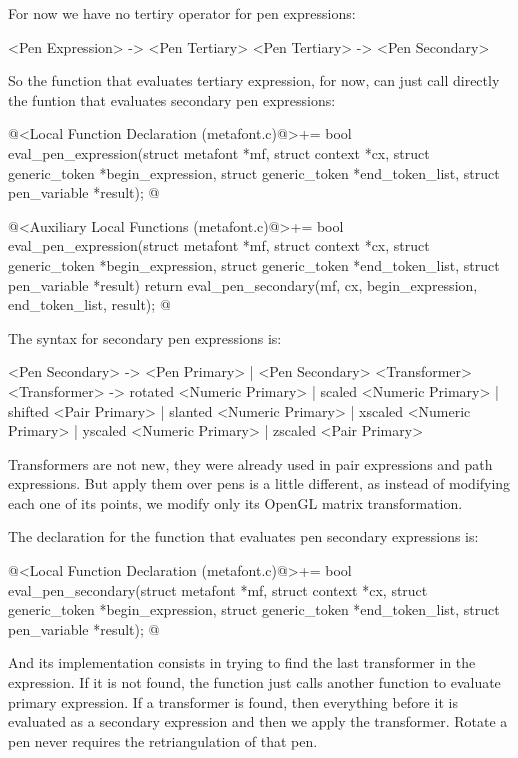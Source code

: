 For now we have no tertiry operator for pen expressions:

\alinhaverbatim
<Pen Expression> -> <Pen Tertiary>
<Pen Tertiary> -> <Pen Secondary>
\alinhanormal

So the function that evaluates tertiary expression, for now, can just
call directly the funtion that evaluates secondary pen expressions:

\iniciocodigo
@<Local Function Declaration (metafont.c)@>+=
bool eval_pen_expression(struct metafont *mf, struct context *cx,
                        struct generic_token *begin_expression,
                        struct generic_token *end_token_list,
                        struct pen_variable *result);
@
\fimcodigo

\iniciocodigo
@<Auxiliary Local Functions (metafont.c)@>+=
bool eval_pen_expression(struct metafont *mf, struct context *cx,
                        struct generic_token *begin_expression,
                        struct generic_token *end_token_list,
                        struct pen_variable *result){
  return eval_pen_secondary(mf, cx, begin_expression, end_token_list, result);
}
@
\fimcodigo


The syntax for secondary pen expressions is:

\alinhaverbatim
<Pen Secondary> -> <Pen Primary> | <Pen Secondary> <Transformer>
<Transformer> -> rotated <Numeric Primary> |
                 scaled <Numeric Primary> |
                 shifted <Pair Primary> |
                 slanted <Numeric Primary> |
                 xscaled <Numeric Primary> |
                 yscaled <Numeric Primary> |
                 zscaled <Pair Primary>
\alinhanormal

Transformers are not new, they were already used in pair expressions
and path expressions. But apply them over pens is a little different,
as instead of modifying each one of its points, we modify only its
OpenGL matrix transformation.

The declaration for the function that evaluates pen secondary
expressions is:

\iniciocodigo
@<Local Function Declaration (metafont.c)@>+=
bool eval_pen_secondary(struct metafont *mf, struct context *cx,
                        struct generic_token *begin_expression,
                        struct generic_token *end_token_list,
                        struct pen_variable *result);
@
\fimcodigo

And its implementation consists in trying to find the last transformer
in the expression. If it is not found, the function just calls another
function to evaluate primary expression. If a transformer is found,
then everything before it is evaluated as a secondary expression and
then we apply the transformer. Rotate a pen never requires the
retriangulation of that pen.


